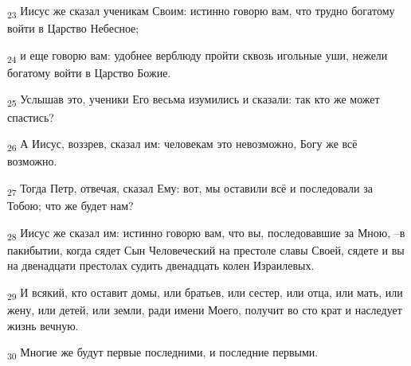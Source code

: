 \begin{tcolorbox}
\textsubscript{23} Иисус же сказал ученикам Своим: истинно говорю вам, что трудно богатому войти в Царство Небесное;
\end{tcolorbox}
\begin{tcolorbox}
\textsubscript{24} и еще говорю вам: удобнее верблюду пройти сквозь игольные уши, нежели богатому войти в Царство Божие.
\end{tcolorbox}
\begin{tcolorbox}
\textsubscript{25} Услышав это, ученики Его весьма изумились и сказали: так кто же может спастись?
\end{tcolorbox}
\begin{tcolorbox}
\textsubscript{26} А Иисус, воззрев, сказал им: человекам это невозможно, Богу же всё возможно.
\end{tcolorbox}
\begin{tcolorbox}
\textsubscript{27} Тогда Петр, отвечая, сказал Ему: вот, мы оставили всё и последовали за Тобою; что же будет нам?
\end{tcolorbox}
\begin{tcolorbox}
\textsubscript{28} Иисус же сказал им: истинно говорю вам, что вы, последовавшие за Мною, --в пакибытии, когда сядет Сын Человеческий на престоле славы Своей, сядете и вы на двенадцати престолах судить двенадцать колен Израилевых.
\end{tcolorbox}
\begin{tcolorbox}
\textsubscript{29} И всякий, кто оставит домы, или братьев, или сестер, или отца, или мать, или жену, или детей, или земли, ради имени Моего, получит во сто крат и наследует жизнь вечную.
\end{tcolorbox}
\begin{tcolorbox}
\textsubscript{30} Многие же будут первые последними, и последние первыми.
\end{tcolorbox}

